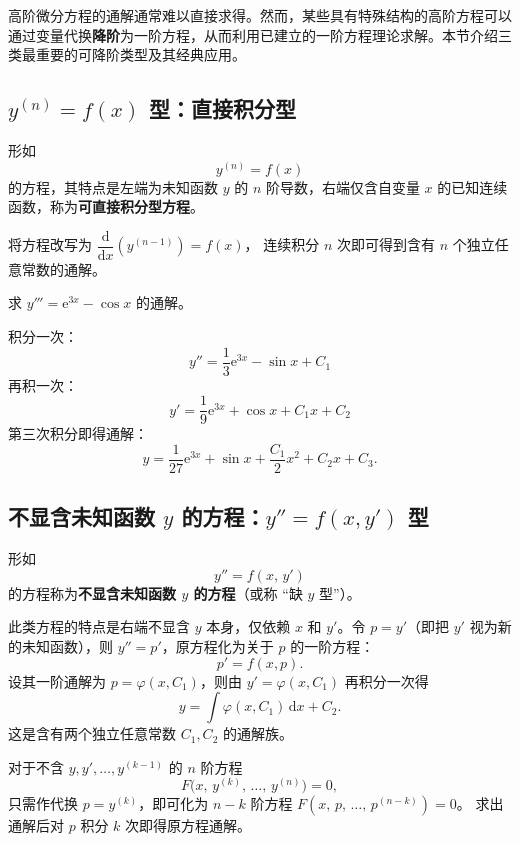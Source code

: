 \documentclass[lang=cn,11pt]{elegantbook}
\begin{document}
高阶微分方程的通解通常难以直接求得。然而，某些具有特殊结构的高阶方程可以通过变量代换\textbf{降阶}为一阶方程，从而利用已建立的一阶方程理论求解。本节介绍三类最重要的可降阶类型及其经典应用。


\subsection{$y^{(n)}=f(x)$ 型：直接积分型}

\begin{definition}[$y^{(n)}=f(x)$ 型方程]
形如
\[y^{(n)}=f(x)\]
的方程，其特点是左端为未知函数 $y$ 的 $n$ 阶导数，右端仅含自变量 $x$ 的已知连续函数，称为\textbf{可直接积分型方程}。
\end{definition}

将方程改写为 $\dfrac{\mathrm{d}}{\mathrm{d}x}\!\left(y^{(n-1)}\right)=f(x)$，
连续积分 $n$ 次即可得到含有 $n$ 个独立任意常数的通解。

\begin{exercise}[逐次积分]
求 $y'''=\mathrm{e}^{3x}-\cos x$ 的通解。
\end{exercise}
\begin{solution}
积分一次：
\[
y''=\dfrac13\mathrm{e}^{3x}-\sin x+C_1
\]
再积一次：
\[
y'=\dfrac19\mathrm{e}^{3x}+\cos x+C_1x+C_2
\]
第三次积分即得通解：
\[
\boxed{y=\frac{1}{27}\mathrm{e}^{3x}+\sin x+\frac{C_1}{2}x^{2}+C_2x+C_3}.
\]
\end{solution}


\subsection{不显含未知函数 $y$ 的方程：$y''=f(x,y')$ 型}

\begin{definition} \label{def:ode-missing-y}
形如
\[y''=f(x,\,y')
\]
的方程称为\textbf{不显含未知函数 $y$ 的方程}（或称 ``缺 $y$ 型''）。
\end{definition}

此类方程的特点是右端不显含 $y$ 本身，仅依赖 $x$ 和 $y'$。令 $p=y'$（即把 $y'$ 视为新的未知函数），则 $y''=p'$，原方程化为关于 $p$ 的一阶方程：
\[
p'=f(x,p).
\]
设其一阶通解为 $p=\varphi(x,C_1)$，则由 $y'=\varphi(x,C_1)$ 再积分一次得
\[
y=\int\varphi(x,C_1)\,\mathrm{d}x+C_2.
\]
这是含有两个独立任意常数 $C_1,C_2$ 的通解族。

\begin{property}[一般化推广]
对于不含 $y, y', \dots, y^{(k-1)}$ 的 $n$ 阶方程
\[
F\bigl(x,\,y^{(k)},\,\dots,\,y^{(n)}\bigr)=0,
\]
只需作代换 $p=y^{(k)}$，即可化为 $n-k$ 阶方程
$F(x,\,p,\,\dots,\,p^{(n-k)})=0$。
求出通解后对 $p$ 积分 $k$ 次即得原方程通解。
\end{property}
\end{document}
